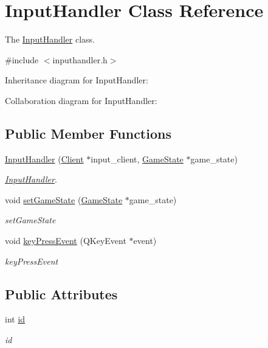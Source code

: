 \hypertarget{class_input_handler}{}\section{Input\+Handler Class Reference}
\label{class_input_handler}


The \hyperlink{class_input_handler}{Input\+Handler} class.  




{\ttfamily \#include $<$inputhandler.\+h$>$}



Inheritance diagram for Input\+Handler\+:


Collaboration diagram for Input\+Handler\+:
\subsection*{Public Member Functions}
\begin{DoxyCompactItemize}
\item 
\hyperlink{class_input_handler_af07e7d630d95ba428578bfd451684748}{Input\+Handler} (\hyperlink{class_client}{Client} $\ast$input\+\_\+client, \hyperlink{class_game_state}{Game\+State} $\ast$game\+\_\+state)
\begin{DoxyCompactList}\small\item\em \hyperlink{class_input_handler}{Input\+Handler}. \end{DoxyCompactList}\item 
void \hyperlink{class_input_handler_a30e6f3d86c107f556ff6d904af33a09a}{set\+Game\+State} (\hyperlink{class_game_state}{Game\+State} $\ast$game\+\_\+state)
\begin{DoxyCompactList}\small\item\em set\+Game\+State \end{DoxyCompactList}\item 
void \hyperlink{class_input_handler_a8a3c7799e3930c10da915c7aebd1ae89}{key\+Press\+Event} (Q\+Key\+Event $\ast$event)
\begin{DoxyCompactList}\small\item\em key\+Press\+Event \end{DoxyCompactList}\end{DoxyCompactItemize}
\subsection*{Public Attributes}
\begin{DoxyCompactItemize}
\item 
int \hyperlink{class_input_handler_a0270673ebea54ca3efbe172c55349c0b}{id}\hypertarget{class_input_handler_a0270673ebea54ca3efbe172c55349c0b}{}\label{class_input_handler_a0270673ebea54ca3efbe172c55349c0b}

\begin{DoxyCompactList}\small\item\em id \end{DoxyCompactList}\end{DoxyCompactItemize}


